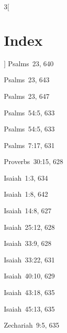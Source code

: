\documentclass[12pt]{report}
\begin{document}
\begin{multicols}{3}[\chapter*{Index}
]
\noindent Psalms\  23, 640
\par
\noindent Psalms\  23, 643
\par
\noindent Psalms\  23, 647
\par
\noindent Psalms\  54:5, 633
\par
\noindent Psalms\  54:5, 633
\par
\noindent Psalms\  7:17, 631
\par
\noindent Proverbs\  30:15, 628
\par
\noindent Isaiah\  1:3, 634
\par
\noindent Isaiah\  1:8, 642
\par
\noindent Isaiah\  14:8, 627
\par
\noindent Isaiah\  25:12, 628
\par
\noindent Isaiah\  33:9, 628
\par
\noindent Isaiah\  33:22, 631
\par
\noindent Isaiah\  40:10, 629
\par
\noindent Isaiah\  43:18, 635
\par
\noindent Isaiah\  45:13, 635
\par
\noindent Zechariah\  9:5, 635
\par
\end{multicols}
\end{document}
